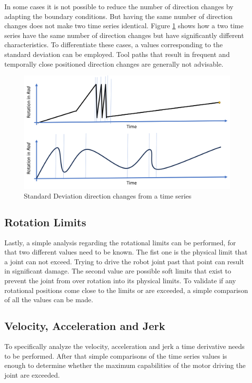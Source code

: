 In some cases it is not possible to reduce the number of direction changes by adapting the boundary conditions. But having the same number of direction changes does not make two time series identical. Figure \ref{dirchangeSTD} shows how a two time series have the same number of direction changes but have significantly different characteristics. To differentiate these cases, a values corresponding to the standard deviation can be employed. Tool paths that result in frequent and temporally close positioned direction changes are generally not advisable.

\begin{figure}[H]
	\centerline{\includegraphics[scale=.4]{figures/DirSTD.png}}
	\caption{Standard Deviation direction changes from a time series}
	\label{dirchangeSTD}
\end{figure}

\subsection{Rotation Limits}
Lastly, a simple analysis regarding the rotational limits can be performed, for that two different values need to be known. The fist one is the physical limit that a joint can not exceed. Trying to drive the robot joint past that point can result in significant damage. The second value are possible soft limits that exist to prevent the joint from over rotation into its physical limits. To validate if any rotational positions come close to the limits or are exceeded, a simple comparison of all the values can be made.

\subsection{Velocity, Acceleration and Jerk}
To specifically analyze the velocity, acceleration and jerk a time derivative needs to be performed. After that simple comparisons of the time series values is enough to determine whether 
the maximum capabilities of the motor driving the joint are exceeded.


